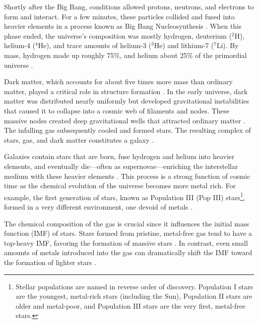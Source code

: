     Shortly after the Big Bang, conditions allowed protons, neutrons, and electrons to form and interact. For a few minutes, these particles collided and fused into heavier elements in a process known as Big Bang Nucleosynthesis \citep{2007ARNPS..57..463S}. When this phase ended, the universe's composition was mostly hydrogen, deuterium ($^2$H), helium-4 ($^4$He), and trace amounts of helium-3 ($^3$He) and lithium-7 ($^7$Li). By mass, hydrogen made up roughly 75\%, and helium about 25\% of the primordial universe \citep{1966ApJ...146..542P,2016RvMP...88a5004C}.

    Dark matter, which accounts for about five times more mass than ordinary matter, played a critical role in structure formation \citep{2020A&A...641A...6P}. In the early universe, dark matter was distributed nearly uniformly but developed gravitational instabilities that caused it to collapse into a cosmic web of filaments and nodes. These massive nodes created deep gravitational wells that attracted ordinary matter \citep{1974ApJ...187..425P}. The infalling gas subsequently cooled and formed stars. The resulting complex of stars, gas, and dark matter constitutes a galaxy \citep{2008LNP...740.....P,2010gfe..book.....M}.

    Galaxies contain stars that are born, fuse hydrogen and helium into heavier elements, and eventually die—often as supernovae—enriching the interstellar medium with these heavier elements \citep{2019A&ARv..27....3M}. This process is a strong function of cosmic time as the chemical evolution of the universe becomes more metal rich. For example, the first generation of stars, known as Population III (Pop III) stars\footnote{Stellar populations are named in reverse order of discovery. Population I stars are the youngest, metal-rich stars (including the Sun), Population II stars are older and metal-poor, and Population III stars are the very first, metal-free stars.}, formed in a very different environment, one devoid of metals \citep{2002Sci...295...93A,2005SSRv..117..445G,2013RPPh...76k2901B}. 

    The chemical composition of the gas is crucial since it influences the initial mass function (IMF) of stars. Stars formed from pristine, metal-free gas tend to have a top-heavy IMF, favoring the formation of massive stars \citep{2002ApJ...571...30S,2006MNRAS.369..825S}. In contrast, even small amounts of metals introduced into the gas can dramatically shift the IMF toward the formation of lighter stars \citep{2021MNRAS.508.4175C}.

